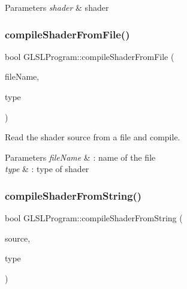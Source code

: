 \begin{DoxyParams}{Parameters}
{\em shader} & shader \\
\hline
\end{DoxyParams}
\hypertarget{class_g_l_s_l_program_a31f24024046d5ed7646d0c53df4898dc}{}\label{class_g_l_s_l_program_a31f24024046d5ed7646d0c53df4898dc} 
\subsubsection{\texorpdfstring{compile\+Shader\+From\+File()}{compileShaderFromFile()}}
{\footnotesize\ttfamily bool G\+L\+S\+L\+Program\+::compile\+Shader\+From\+File (\begin{DoxyParamCaption}\item[{const char $\ast$}]{file\+Name,  }\item[{\hyperlink{namespace_g_l_s_l_shader_a5da03bdfde28d414fcf090182b3b8177}{G\+L\+S\+L\+Shader\+::\+G\+L\+S\+L\+Shader\+Type}}]{type }\end{DoxyParamCaption})}



Read the shader source from a file and compile. 


\begin{DoxyParams}{Parameters}
{\em file\+Name} & \+: name of the file \\
\hline
{\em type} & \+: type of shader \\
\hline
\end{DoxyParams}
\hypertarget{class_g_l_s_l_program_a428c7ce6d50b7100d06c621e6647dda8}{}\label{class_g_l_s_l_program_a428c7ce6d50b7100d06c621e6647dda8} 
\subsubsection{\texorpdfstring{compile\+Shader\+From\+String()}{compileShaderFromString()}}
{\footnotesize\ttfamily bool G\+L\+S\+L\+Program\+::compile\+Shader\+From\+String (\begin{DoxyParamCaption}\item[{const string \&}]{source,  }\item[{\hyperlink{namespace_g_l_s_l_shader_a5da03bdfde28d414fcf090182b3b8177}{G\+L\+S\+L\+Shader\+::\+G\+L\+S\+L\+Shader\+Type}}]{type }\end{DoxyParamCaption})}




